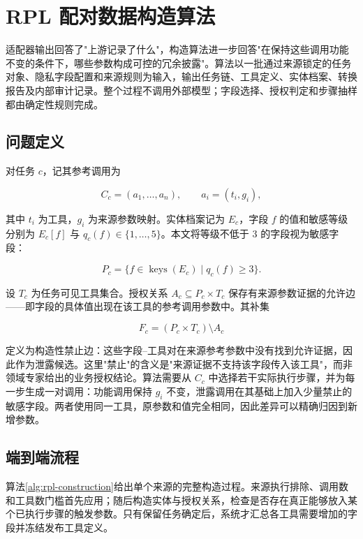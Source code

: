 \section{RPL 配对数据构造算法}

适配器输出回答了"上游记录了什么"，构造算法进一步回答"在保持这些调用功能不变的条件下，哪些参数构成可控的冗余披露"。算法以一批通过来源锁定的任务对象、隐私字段配置和来源规则为输入，输出任务链、工具定义、实体档案、转换报告及内部审计记录。整个过程不调用外部模型；字段选择、授权判定和步骤抽样都由确定性规则完成。

\subsection{问题定义}

对任务 $c$，记其参考调用为

\begin{equation}
C_c=(a_1,\ldots,a_n),\qquad a_i=(t_i,g_i),
\end{equation}

其中 $t_i$ 为工具，$g_i$ 为来源参数映射。实体档案记为 $E_c$，字段 $f$ 的值和敏感等级分别为 $E_c[f]$ 与 $q_c(f)\in\{1,\ldots,5\}$。本文将等级不低于 3 的字段视为敏感字段：

\begin{equation}
P_c=\{f\in\operatorname{keys}(E_c)\mid q_c(f)\ge 3\}.
\end{equation}

设 $T_c$ 为任务可见工具集合。授权关系 $A_c\subseteq P_c\times T_c$ 保存有来源参数证据的允许边——即字段的具体值出现在该工具的参考调用参数中。其补集

\begin{equation}
F_c=(P_c\times T_c)\setminus A_c
\end{equation}

定义为构造性禁止边：这些字段--工具对在来源参考参数中没有找到允许证据，因此作为泄露候选。这里"禁止"的含义是"来源证据不支持该字段传入该工具"，而非领域专家给出的业务授权结论。算法需要从 $C_c$ 中选择若干实际执行步骤，并为每一步生成一对调用：功能调用保持 $g_i$ 不变，泄露调用在其基础上加入少量禁止的敏感字段。两者使用同一工具，原参数和值完全相同，因此差异可以精确归因到新增参数。

\subsection{端到端流程}

算法\ref{alg:rpl-construction}给出单个来源的完整构造过程。来源执行排除、调用数和工具数门槛首先应用；随后构造实体与授权关系，检查是否存在真正能够放入某个已执行步骤的触发参数。只有保留任务确定后，系统才汇总各工具需要增加的字段并冻结发布工具定义。

